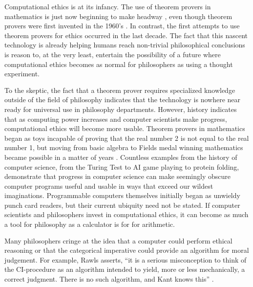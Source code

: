 \begin{isabellebody}
\begin{isamarkuptext}
Computational ethics is at its infancy. The use of theorem provers in mathematics is just now beginning 
to make headway \citep{buzzardvideo}, even though theorem provers were first invented in the 1960's \citep{historyofITP}. 
In contrast, the first attempts to use theorem provers for ethics occurred in the last decade. The 
fact that this nascent technology is already helping humans reach non-trivial philosophical conclusions 
is reason to, at the very least, entertain the possibility of a future where computational ethics 
becomes as normal for philosophers as using a thought experiment.

To the skeptic, the fact that a theorem prover requires specialized knowledge outside of the field 
of philosophy indicates that the technology is nowhere near ready for universal use in philosophy 
departments. However, history indicates that as computing power increases and computer scientists make 
progress, computational ethics will become more usable. Theorem provers in mathematics began as toys 
incapable of proving that the real number 2 is not equal to the real number 1, but 
moving from basic algebra to Fields medal winning mathematics became possible in a
matter of years \citep{buzzardvideo}. Countless examples from the history of computer science, from the Turing 
Test to AI game playing to protein folding, demonstrate that progress in computer science can make seemingly 
obscure computer programs useful and usable in ways that exceed our wildest imaginations.
Programmable computers themselves initially began as unwieldy punch card readers, but their current ubiquity 
need not be stated. If computer scientists and philosophers invest in computational ethics, it can 
become as much a tool for philosophy as a calculator is for for arithmetic.%
\end{isamarkuptext}\isamarkuptrue%
%
\isadelimdocument
%
\endisadelimdocument
%
\isatagdocument
%
\isamarkuptrue%
%
\endisatagdocument
{\isafolddocument}%
%
\isadelimdocument
%
\endisadelimdocument
%
\begin{isamarkuptext}%
Many philosophers cringe at the idea that a computer could perform ethical reasoning or that the 
categorical imperative could provide an algorithm for moral judgement. For example, Rawls asserts, 
``it is a serious misconception to think of the CI-procedure as an algorithm intended to yield, 
more or less mechanically, a correct judgment. There is no such algorithm, and Kant knows this'' \citep[166]{rawlslectures}. 

\end{isamarkuptext}
\end{isabellebody}
